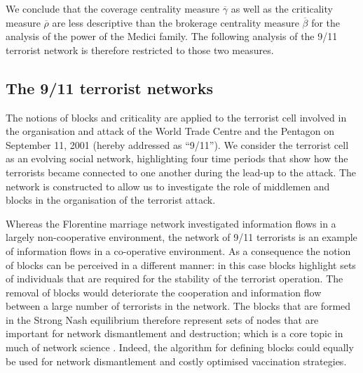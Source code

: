 We conclude that the coverage centrality measure $\overline{\gamma}$ as well as the criticality measure $\overline{\rho}$ are less descriptive than the brokerage centrality measure $\overline{\beta}$ for the analysis of the power of the Medici family. The following analysis of the 9/11 terrorist network is therefore restricted to those two measures.

\subsection{The 9/11 terrorist networks}

The notions of blocks and criticality are applied to the terrorist cell involved in the organisation and attack of the World Trade Centre and the Pentagon on September 11, 2001 (hereby addressed as ``9/11''). We consider the terrorist cell as an evolving social network, highlighting four time periods that show how the terrorists became connected to one another during the lead-up to the attack. The network is constructed to allow us to investigate the role of middlemen and blocks in the organisation of the terrorist attack.

Whereas the Florentine marriage network investigated information flows in a largely non-cooperative environment, the network of 9/11 terrorists is an example of information flows in a co-operative environment. As a consequence the notion of blocks can be perceived in a different manner: in this case blocks highlight sets of individuals that are required for the stability of the terrorist operation. The removal of blocks would deteriorate the cooperation and information flow between a large number of terrorists in the network. The blocks that are formed in the Strong Nash equilibrium therefore represent sets of nodes that are important for network dismantlement and destruction; which is a core topic in much of network science \citep{Carley2002, Carley2006, KovacsBarabasi2015, MoroneMaske2015}. Indeed, the algorithm for defining blocks could equally be used for network dismantlement and costly optimised vaccination strategies.

